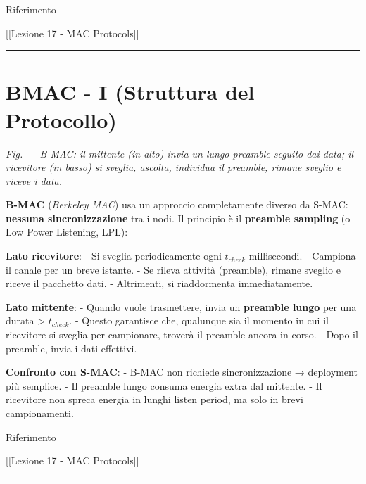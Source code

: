 \documentclass[
  italian,
  openany]{book}
\begin{document}
\begin{calloutnote}{Riferimento}

{[}{[}Lezione 17 - MAC Protocols{]}{]}

\end{calloutnote}

\begin{center}\rule{0.5\linewidth}{0.5pt}\end{center}

\section{BMAC - I (Struttura del
Protocollo)}\label{bmac---i-struttura-del-protocollo}

\emph{Fig. --- B-MAC: il mittente (in alto) invia un lungo preamble
seguito dai data; il ricevitore (in basso) si sveglia, ascolta,
individua il preamble, rimane sveglio e riceve i data.}

\textbf{B-MAC} (\emph{Berkeley MAC}) usa un approccio completamente
diverso da S-MAC: \textbf{nessuna sincronizzazione} tra i nodi. Il
principio è il \textbf{preamble sampling} (o Low Power Listening, LPL):

\textbf{Lato ricevitore}: - Si sveglia periodicamente ogni \(t_{check}\)
millisecondi. - Campiona il canale per un breve istante. - Se rileva
attività (preamble), rimane sveglio e riceve il pacchetto dati. -
Altrimenti, si riaddormenta immediatamente.

\textbf{Lato mittente}: - Quando vuole trasmettere, invia un
\textbf{preamble lungo} per una durata \textgreater{} \(t_{check}\). -
Questo garantisce che, qualunque sia il momento in cui il ricevitore si
sveglia per campionare, troverà il preamble ancora in corso. - Dopo il
preamble, invia i dati effettivi.

\textbf{Confronto con S-MAC}: - B-MAC non richiede sincronizzazione →
deployment più semplice. - Il preamble lungo consuma energia extra dal
mittente. - Il ricevitore non spreca energia in lunghi listen period, ma
solo in brevi campionamenti.

\begin{calloutnote}{Riferimento}

{[}{[}Lezione 17 - MAC Protocols{]}{]}

\end{calloutnote}

\begin{center}\rule{0.5\linewidth}{0.5pt}\end{center}
\end{document}
